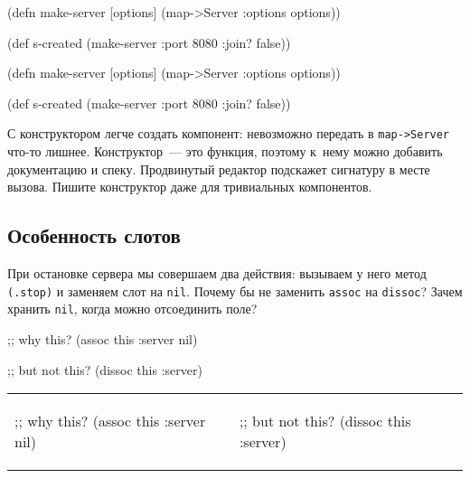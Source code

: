 \ifx\DEVICETYPE\MOBILE

\begin{english}
  \begin{clojure}
(defn make-server
  [options]
  (map->Server {:options options}))

(def s-created
  (make-server {:port 8080
                :join? false}))
  \end{clojure}
\end{english}

\else

\begin{english}
  \begin{clojure}
(defn make-server
  [options]
  (map->Server {:options options}))

(def s-created (make-server {:port 8080 :join? false}))
  \end{clojure}
\end{english}

\fi

С конструктором легче создать компонент: невозможно передать в
\verb|map->Server| что-то лишнее. Конструктор~--- это функция, поэтому к~нему можно
добавить документацию и спеку. Продвинутый редактор подскажет сигнатуру в месте
вызова. Пишите конструктор даже для тривиальных компонентов.

\subsection{Особенность слотов}

При остановке сервера мы совершаем два действия: вызываем у него метод
\verb|(.stop)| и заменяем слот на \verb|nil|. Почему бы не заменить
\verb|assoc| на \verb|dissoc|? Зачем хранить \verb|nil|, когда можно
отсоединить поле?

\ifx\DEVICETYPE\MOBILE

\begin{english}
  \begin{clojure}
;; why this?
(assoc this :server nil)
  \end{clojure}

\splitter

  \begin{clojure}
;; but not this?
(dissoc this :server)
  \end{clojure}
\end{english}

\else

\begin{english}

\noindent
\begin{tabular}{ @{}p{5cm} @{}p{5cm} }

  \begin{clojure}
;; why this?
(assoc this :server nil)
  \end{clojure}

&

  \begin{clojure}
;; but not this?
(dissoc this :server)
  \end{clojure}

\end{tabular}

\end{english}

